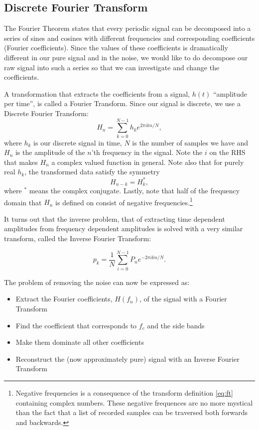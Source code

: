 \documentclass[12pt,a4paper]{article}
\begin{document}
\subsection{Discrete Fourier Transform}\label{sec:ft}
The Fourier Theorem states that every periodic signal can be decomposed into
a series of sines and cosines with different frequencies and corresponding coefficients (Fourier coefficients).
Since the values of these coefficients%
is dramatically different in our pure signal and in the noise,
we would like to do decompose our raw signal into such a series so that we can
investigate and change the coefficients.

A transformation that extracts the coefficients from a signal, $h(t)$ ``amplitude per time'',
is called a Fourier Transform. Since our signal is discrete, we use a Discrete Fourier
Transform:
\begin{equation}\label{eq:ft}
  H_n = \sum_{k=0}^{N-1} h_ke^{2\pi ikn/N},
\end{equation}
where $h_k$ is our discrete signal in time, $N$ is the number of samples we have and
$H_n$ is the amplitude of the $n$'th frequency in the signal.
Note the $i$ on the RHS that makes $H_n$ a complex valued function in general.
Note also that for purely real $h_k$, the transformed data satisfy the symmetry
\begin{equation}\label{eq:symmetry}
  H_{n-k} = H_k^*,
\end{equation}
where $^*$ means the complex conjugate.
Lastly, note that half of the frequency domain that $H_n$ is defined on
consist of negative frequencies.\footnote{Negative frequencies is a
consequence of the transform definition \eqref{eq:ft} containing complex numbers.
These negative frequences are no more
mystical than the fact that a list of recorded samples can be traversed both
forwards and backwards.}

It turns out that the inverse problem, that of extracting time dependent
amplitudes from frequency dependent amplitudes is solved with a very
similar transform, called the Inverse Fourier Transform:

\begin{equation}\label{eq:ift}
  p_k = \frac1N\sum_{i=0}^{N-1}P_ne^{-2\pi ikn/N}.
\end{equation}

The problem of removing the noise can now be expressed as:
\begin{itemize}
  \item Extract the Fourier coefficients, $H(f_n)$, of the signal with a Fourier Transform
  \item Find the coefficient that corresponds to $f_c$ and the side bands
  \item Make them dominate all other coefficients
  \item Reconstruct the (now approximately pure) signal with an Inverse Fourier Transform
\end{itemize}
\end{document}
